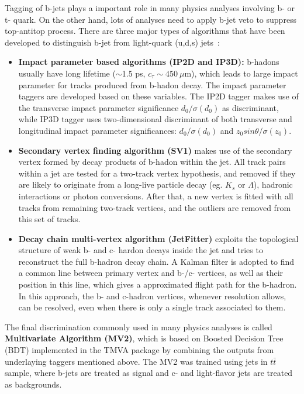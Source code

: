 Tagging of b-jets plays a important role in many physics analyses involving b- or t- quark.
On the other hand, lots of analyses need to apply b-jet veto to suppress top-antitop process.
There are three major types of algorithms that have been developed to distinguish b-jet from light-quark (u,d,s) jets~\cite{ATL-PHYS-PUB-2016-012}:
\begin{itemize}
	\item \textbf{Impact parameter based algorithms (IP2D and IP3D):} b-hadons usually have long lifetime ($\sim$1.5 ps, $c_{\tau}\sim450~\mu$m), which leads to large impact parameter for tracks produced from b-hadon decay. The impact parameter taggers are developed based on these variables. The IP2D tagger makes use of the transverse impact parameter significance $d_{0}/\sigma(d_{0})$ as discriminant, while IP3D tagger uses two-dimensional discriminant of both transverse and longitudinal impact parameter significances: $d_{0}/\sigma(d_{0})$ and $z_{0}sin\theta/\sigma(z_{0})$.
	\item \textbf{Secondary vertex finding algorithm (SV1)} makes use of the secondary vertex formed by decay products of b-hadon within the jet. All track pairs within a jet are tested for a two-track vertex hypothesis, and removed if they are likely to originate from a long-live particle decay (eg. $K_{s}$ or $\Lambda$), hadronic interactions or photon conversions. After that, a new vertex is fitted with all tracks from remaining two-track vertices, and the outliers are removed from this set of tracks.
	\item \textbf{Decay chain multi-vertex algorithm (JetFitter)}\cite{Piacquadio_2008} exploits the topological structure of weak b- and c- hardon decays inside the jet and tries to reconstruct the full b-hadron decay chain. A Kalman filter is adopted to find a common line between primary vertex and b-/c- vertices, as well as their position in this line, which gives a approximated flight path for the b-hadron. In this approach, the b- and c-hadron vertices, whenever resolution allows, can be resolved, even when there is only a single track associated to them.
\end{itemize}
The final discrimination commonly used in many physics analyses is called \textbf{Multivariate Algorithm (MV2)}, which is based on Boosted Decision Tree (BDT) implemented in the TMVA package\cite{Speckmayer_2010} by combining the outputs from underlaying taggers mentioned above.
The MV2 was trained using jets in $t\bar{t}$ sample, where b-jets are treated as signal and c- and light-flavor jets are treated as backgrounds.
